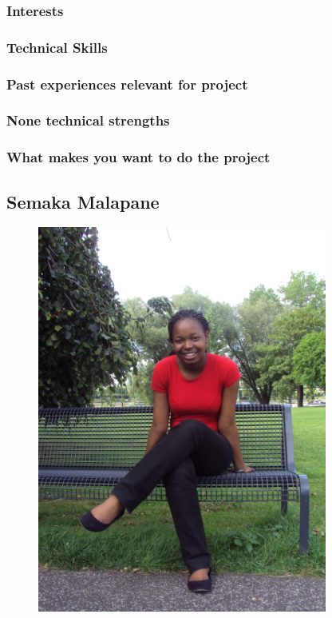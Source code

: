 \documentclass[hidelinks, 12pt, oneside]{article}
\begin{document}
\subsubsection{Interests}
\subsubsection{Technical Skills}
\subsubsection{Past experiences relevant for project}
\subsubsection{None technical strengths}
\subsubsection{What makes you want to do the project}

\subsection{Semaka Malapane}

\begin{figure}[h!]
  \centering
    \includegraphics[width=0.85\textwidth]{Semaka} 
\end{figure}
\end{document}
